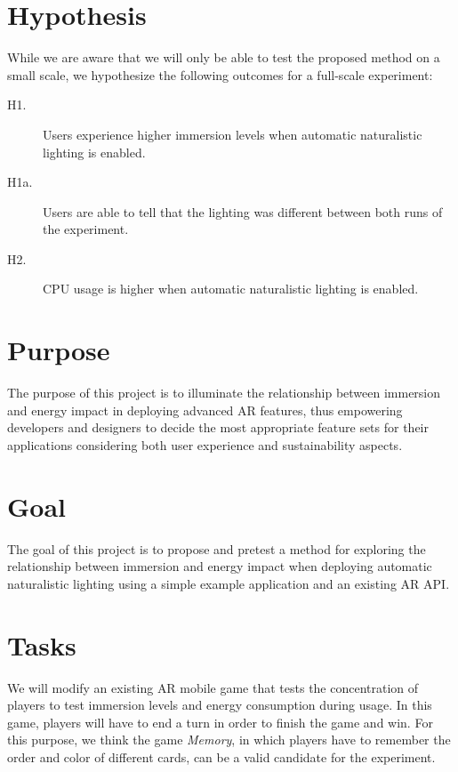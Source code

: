 \documentclass[12pt,twoside,english]{article}
\begin{document}
\section{Hypothesis}
\label{sect:hypothesis}

While we are aware that we will only be able to test the proposed method on a small scale, we hypothesize the following outcomes for a full-scale experiment:

\begin{description}
    \item[H1.] Users experience higher immersion levels when automatic naturalistic lighting is enabled.
    \item[H1a.] Users are able to tell that the lighting was different between both runs of the experiment.
    \item[H2.] \gls{CPU} usage is higher when automatic naturalistic lighting is enabled.
\end{description}



\section{Purpose}
\label{sect:purpose}

The purpose of this project is to illuminate the relationship between immersion and energy impact in deploying advanced \gls{AR} features, thus empowering developers and designers to decide the most appropriate feature sets for their applications considering both user experience and sustainability aspects.

\section{Goal}
\label{sect:goals}

The goal of this project is to propose and pretest a method for exploring the relationship between immersion and energy impact when deploying automatic naturalistic lighting using a simple example application and an existing \gls{AR} \gls{API}.

\section{Tasks}
\label{sect:tasks}

We will modify an existing \gls{AR} mobile game that tests the concentration of players to test immersion levels and energy consumption during usage.
In this game, players will have to end a turn in order to finish the game and win.
For this purpose, we think the game \textit{Memory}, in which players have to remember the order and color of different cards, can be a valid candidate for the experiment.
\end{document}
